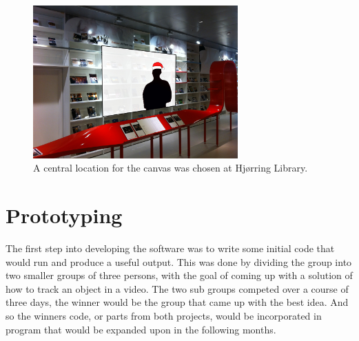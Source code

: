 


\begin{figure}[htbp]
\centering
\includegraphics[width=0.7\textwidth]{Pictures/HjoerringLibrary/LocationJohannesHat.jpg}
\caption{A central location for the canvas was chosen at Hj{\o}rring Library.}
\label{fig:concept_art}
\end{figure}


\section{Prototyping}
The first step into developing the software was to write some initial code that would run and produce a useful output. This was done by dividing the group into two smaller groups of three persons, with the goal of coming up with a solution of how to track an object in a video. The two sub groups competed over a course of three days, the winner would be the group that came up with the best idea. And so the winners code, or parts from both projects, would be incorporated in program that would be expanded upon in the following months.

